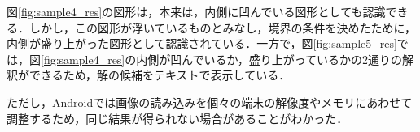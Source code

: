 \documentclass{jarticle}
\begin{document}
図\ref{fig:sample4_res}の図形は，本来は，内側に凹んでいる図形としても認識できる．しかし，この図形が浮いているものとみなし，境界の条件を決めたために，内側が盛り上がった図形として認識されている．一方で，図\ref{fig:sample5_res}では，図\ref{fig:sample4_res}の内側が凹んでいるか，盛り上がっているかの2通りの解釈ができるため，解の候補をテキストで表示している．

ただし，Androidでは画像の読み込みを個々の端末の解像度やメモリにあわせて調整するため，同じ結果が得られない場合があることがわかった．

\begin{figure}[H]
\centering
\end{figure}
\end{document}
